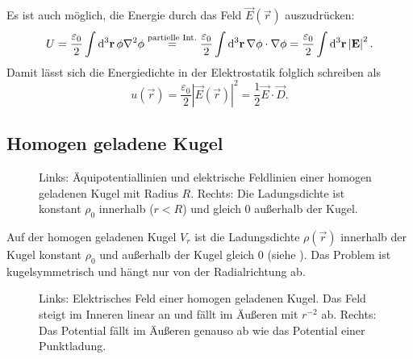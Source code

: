Es ist auch möglich, die Energie durch das Feld $\vec {E}\left(\vec {r}\right)$ auszudrücken:
\begin{equation*}
	U=\frac{\varepsilon _{0}}{2}\int \diffa[3]{\vec{r}}\phi \nabla ^{2}\phi \overset{\text{partielle Int}.}{=}\frac{\varepsilon _{0}}{2}\int \diffa[3]{\vec{r}}\nabla \phi \cdot \nabla \phi =\frac{\varepsilon _{0}}{2}\int \diffa[3]{\vec{r}}\left| \vec {E}\right| ^{2}.
\end{equation*}
Damit lässt sich die Energiedichte in der Elektrostatik folglich schreiben als
\begin{equation*}
	u\left(\vec {r}\right)=\frac{\varepsilon _{0}}{2}\left| \vec {E}\left(\vec {r}\right)\right| ^{2}=\frac{1}{2}\vec {E}\cdot \vec {D}.
\end{equation*}



\subsection{Homogen geladene Kugel}

\begin{figure}[htb]
	\centering
	\tfigEfieldAndPotLinesAndChargeDensitityHomoChargedSphere
	\caption{Links: Äquipotentiallinien und elektrische Feldlinien einer homogen geladenen Kugel mit Radius $R$. Rechts: Die Ladungsdichte ist konstant $\rho_0$ innerhalb ($r<R$) und gleich 0 außerhalb der Kugel. }
	\label{fig:homogenously_charged_ball}
\end{figure}

Auf der homogen geladenen Kugel $V_{r}$ ist die Ladungsdichte $\rho \left(\vec {r}\right)$ innerhalb der Kugel konstant $\rho _{0}$ und außerhalb der Kugel gleich $0$ (siehe ). Das Problem ist kugelsymmetrisch und hängt nur von der Radialrichtung ab.



\begin{figure}[htb]
	\centering
	\tfigEfieldAndPotentialHomoChargedSphere
	\caption{Links: Elektrisches Feld einer homogen geladenen Kugel. Das Feld steigt im Inneren linear an und fällt im Äußeren mit $r^{-2}$ ab. Rechts: Das Potential fällt im Äußeren genauso ab wie das Potential einer Punktladung. }
	\label{fig:homogenously_charged_ball_field_potential}
\end{figure}

